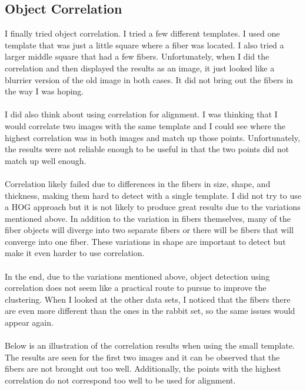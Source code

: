 \documentclass[11pt,psfig]{article}
\begin{document}
\subsection{Object Correlation}
I finally tried object correlation. I tried a few different templates. I used one template that was just a little square where a fiber was located. I also tried a larger middle square that had a few fibers. Unfortunately, when I did the correlation and then displayed the results as an image, it just looked like a blurrier version of the old image in both cases. It did not bring out the fibers in the way I was hoping. \\
\\
I did also think about using correlation for alignment. I was thinking that I would correlate two images with the same template and I could see where the highest correlation was in both images and match up those points. Unfortunately, the results were not reliable enough to be useful in that the two points did not match up well enough. \\
\\
Correlation likely failed due to differences in the fibers in size, shape, and thickness, making them hard to detect with a single template. I did not try to use a HOG approach but it is not likely to produce great results due to the variations mentioned above. In addition to the variation in fibers themselves, many of the fiber objects will diverge into two separate fibers or there will be fibers that will converge into one fiber. These variations in shape are important to detect but make it even harder to use correlation. \\
\\
In the end, due to the variations mentioned above, object detection using correlation does not seem like a practical route to pursue to improve the clustering. When I looked at the other data sets, I noticed that the fibers there are even more different than the ones in the rabbit set, so the same issues would appear again.\\
\\
Below is an illustration of the correlation results when using the small template. The results are seen for the first two images and it can be observed that the fibers are not brought out too well. Additionally, the points with the highest correlation do not correspond too well to be used for alignment.
\end{document}

